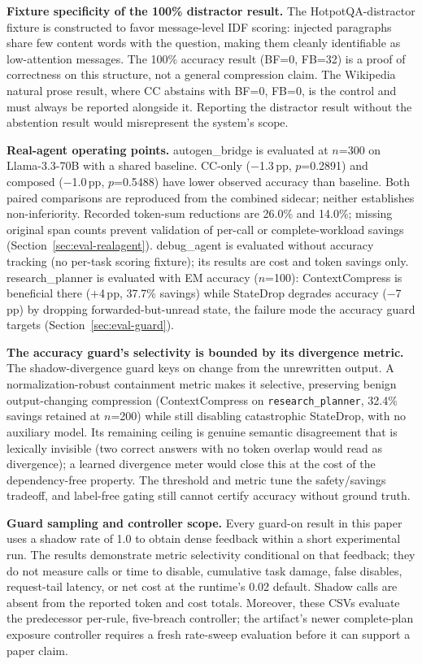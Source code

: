 \textbf{Fixture specificity of the 100\% distractor result.} The HotpotQA-distractor
fixture is constructed to favor message-level IDF scoring: injected paragraphs share
few content words with the question, making them cleanly identifiable as low-attention
messages. The 100\% accuracy result (BF=0, FB=32) is a proof of correctness on this
structure, not a general compression claim. The Wikipedia natural prose result, where
CC abstains with BF=0, FB=0, is the control and must always be reported alongside it.
Reporting the distractor result without the abstention result would misrepresent the
system's scope.

\textbf{Real-agent operating points.} autogen\_bridge is evaluated at $n$=300 on
Llama-3.3-70B with a shared baseline. CC-only ($-$1.3\,pp, $p$=0.2891) and composed
($-$1.0\,pp, $p$=0.5488) have lower observed accuracy than baseline. Both paired
comparisons are reproduced from the combined sidecar; neither establishes
non-inferiority. Recorded token-sum reductions are 26.0\% and 14.0\%; missing
original span counts prevent validation of per-call or complete-workload savings
(Section~\ref{sec:eval-realagent}).
debug\_agent is evaluated without accuracy tracking (no per-task scoring fixture); its
results are cost and token savings only. research\_planner is evaluated with EM accuracy
($n$=100): ContextCompress is beneficial there ($+$4\,pp, 37.7\% savings) while StateDrop
degrades accuracy ($-$7\,pp) by dropping forwarded-but-unread state, the failure mode the
accuracy guard targets (Section~\ref{sec:eval-guard}).

\textbf{The accuracy guard's selectivity is bounded by its divergence metric.} The
shadow-divergence guard keys on change from the unrewritten output. A normalization-robust
containment metric makes it selective, preserving benign output-changing compression
(ContextCompress on \texttt{research\_planner}, 32.4\% savings retained at $n$=200) while
still disabling catastrophic StateDrop, with no auxiliary model. Its remaining ceiling is
genuine semantic disagreement that is lexically invisible (two correct answers with no
token overlap would read as divergence); a learned divergence meter would close this at the
cost of the dependency-free property. The threshold and metric tune the safety/savings
tradeoff, and label-free gating still cannot certify accuracy without ground truth.

\textbf{Guard sampling and controller scope.} Every guard-on result in this paper
uses a shadow rate of 1.0 to obtain dense feedback within a short experimental run.
The results demonstrate metric selectivity conditional on that feedback; they do not
measure calls or time to disable, cumulative task damage, false disables, request-tail
latency, or net cost at the runtime's 0.02 default. Shadow calls are absent from the
reported token and cost totals. Moreover, these CSVs evaluate the predecessor per-rule,
five-breach controller; the artifact's newer complete-plan exposure controller requires
a fresh rate-sweep evaluation before it can support a paper claim.

